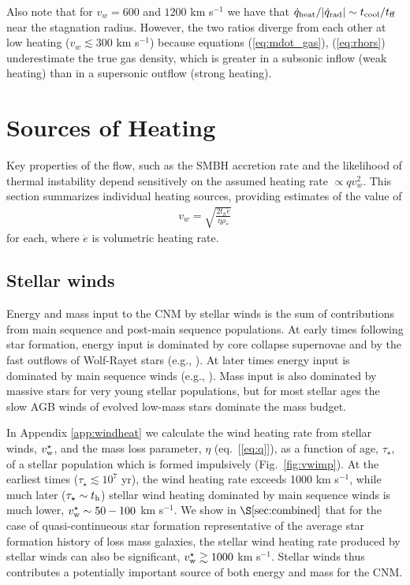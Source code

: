 \documentclass[usenatbib,fleqn]{mn2e}
\newcommand{\rhostar}{\rho_*}
\begin{document}
Also note that for $v_{w}=600$ and $1200$ km s$^{-1}$ we have that $\dot{q}_{\rm heat}/|\dot{q}_{\rm rad}| \sim t_{\rm cool}/t_{\rm ff}$ near the stagnation radius.  However, the two ratios diverge from each other at low heating ($v_{w} \lesssim 300$ km s$^{-1}$) because equations (\ref{eq:mdot_gas}), (\ref{eq:rhors}) underestimate the true gas density, which is greater in a subsonic inflow (weak heating) than in a supersonic outflow (strong heating).  

\section{Sources of Heating}
\label{sec:heating}

Key properties of the flow, such as the SMBH accretion rate and the likelihood of thermal instability depend sensitively on the assumed heating rate $\propto qv_{w}^{2}$.  This section summarizes individual heating sources, providing estimates of the value of
\begin{align}
  v_{w} = \sqrt{\frac{2 t_h \dot{e}}{\eta \rhostar}}
  \label{eq:vw_eff}
\end{align}
for each, where $\dot{e}$ is volumetric heating rate.  

\subsection{Stellar winds} 

Energy and mass input to the CNM by stellar winds is the sum of contributions from main sequence and post-main sequence populations.  At early times following star formation, energy input is dominated by core collapse supernovae and by the fast outflows of Wolf-Rayet stars (e.g., \citealt{VossDiehl+:2009a}).  At later times energy input is dominated by main sequence winds (e.g., \citealt{NaimanSoares-Furtado+:2013a}).  Mass input is also dominated by massive stars for very young stellar populations, but for most stellar ages the slow AGB winds of evolved low-mass stars dominate the mass budget.  

In Appendix \ref{app:windheat} we calculate the wind heating rate from stellar winds, $v_{\rm w}^{\star}$, and the mass loss parameter, $\eta$ (eq.~[\ref{eq:q}]), as a function of age, $\tau_{\star}$, of a stellar population which is formed impulsively (Fig.~\ref{fig:vwimp}).  At the earliest times ($\tau_{\star} \lesssim 10^{7}$ yr), the wind heating rate exceeds 1000 km s$^{-1}$, while much later ($\tau_{\star} \sim t_{\rm h}$) stellar wind heating dominated by main sequence winds is much lower, $v^{\star}_{\rm w} \sim 50-100 $ km s$^{-1}$.  We show in $\S\ref{sec:combined}$ that for the case of quasi-continueous star formation representative of the average star formation history of loss mass galaxies, the stellar wind heating rate produced by stellar winds can also be significant, $v_{\rm w}^{\star} \gtrsim 1000$ km s$^{-1}$.  Stellar winds thus contributes a potentially important source of both energy and mass for the CNM.
\end{document}

